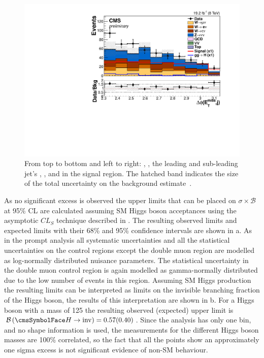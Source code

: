 \begin{figure}
    \includegraphics[width=.65\largefigwidth]{plots/parked/HIG-14-038-figs/output_sigreg/nunu_alljetsmetnomu_mindphi.pdf}

    \caption[From top to bottom and left to right: \detajj, \Mjj, the leading and sub-leading jet's \pt, \METnoMU, \METsig and \jetmetdphi in the signal region. The hatched band indicates the size of the total uncertainty on the background estimate.]{From top to bottom and left to right: \detajj, \Mjj, the leading and sub-leading jet's \pt, \METnoMU, \METsig and \jetmetdphi in the signal region. The hatched band indicates the size of the total uncertainty on the background estimate~\cite{CMS-PAS-HIG-14-038}.}
   \label{fig:parkednunucontplots}
\end{figure}

As no significant excess is observed the upper limits that can be placed on $\sigma\times\mathcal{B}$ at 95\% \ac{CL} are calculated assuming \ac{SM} Higgs boson acceptances using the asymptotic $CL_{S}$ technique described in . The resulting observed limits and expected limits with their 68\% and 95\% confidence intervals are shown in a. As in the prompt analysis all systematic uncertainties and all the statistical uncertainties on the control regions except the double muon region are modelled as log-normally distributed nuisance parameters. The statistical uncertainty in the double muon control region is again modelled as gamma-normally distributed due to the low number of events in this region. Assuming \ac{SM} Higgs production the resulting limits can be interpreted as limits on the invisible branching fraction of the Higgs boson, the results of this interpretation are shown in b. For a Higgs boson with a mass of 125 \GeV the resulting observed (expected) upper limit is $\BRinv=0.57 (0.40)$. Since the analysis has only one bin, and no shape information is used, the measurements for the different Higgs boson masses are 100\% correlated, so the fact that all the points show an approximately one sigma excess is not significant evidence of non-\ac{SM} behaviour.

